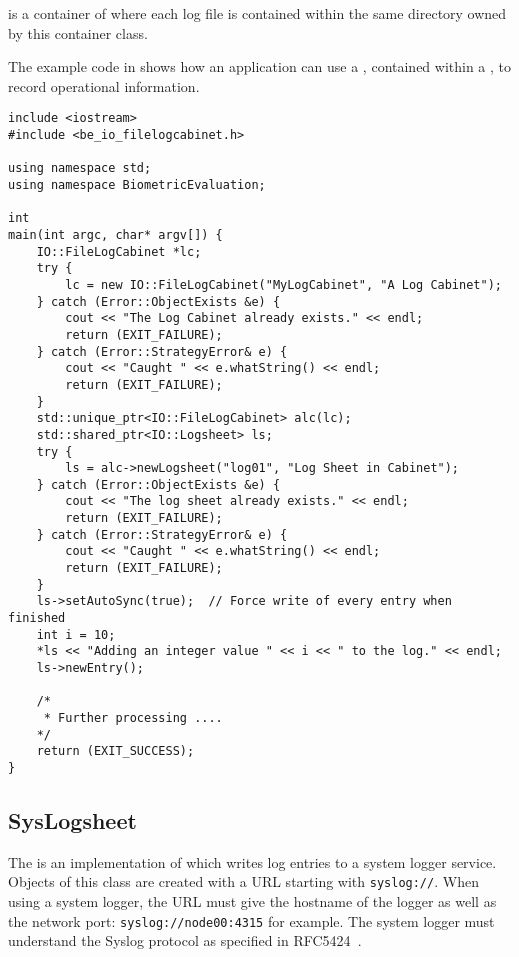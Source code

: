  is a container of  where
each log file is contained within the same directory owned by this container
class.

The example code in  shows how an application can use 
a , contained within a , to record
operational information.

\begin{lstlisting}[caption={Using a \class{FileLogsheet} within a \class{FileLogCabinet}}, label=lst:logcabinetuse]
include <iostream>
#include <be_io_filelogcabinet.h>

using namespace std;
using namespace BiometricEvaluation;

int
main(int argc, char* argv[]) {
    IO::FileLogCabinet *lc;
    try {
        lc = new IO::FileLogCabinet("MyLogCabinet", "A Log Cabinet");
    } catch (Error::ObjectExists &e) {
        cout << "The Log Cabinet already exists." << endl;
        return (EXIT_FAILURE);
    } catch (Error::StrategyError& e) {
        cout << "Caught " << e.whatString() << endl;
        return (EXIT_FAILURE);
    }
    std::unique_ptr<IO::FileLogCabinet> alc(lc);
    std::shared_ptr<IO::Logsheet> ls;
    try {
        ls = alc->newLogsheet("log01", "Log Sheet in Cabinet");
    } catch (Error::ObjectExists &e) {
        cout << "The log sheet already exists." << endl;
        return (EXIT_FAILURE);
    } catch (Error::StrategyError& e) {
        cout << "Caught " << e.whatString() << endl;
        return (EXIT_FAILURE);
    }
    ls->setAutoSync(true);  // Force write of every entry when finished
    int i = 10;
    *ls << "Adding an integer value " << i << " to the log." << endl;
    ls->newEntry();

    /*
     * Further processing ....
    */
    return (EXIT_SUCCESS);
}
\end{lstlisting}

\subsection{SysLogsheet}
\label{sec-syslogsheet}

The  is an implementation of  which writes
log entries to a system logger service. Objects of this class are created
with a URL starting with \verb=syslog://=.
When using a system logger, the URL must give the hostname of the logger as
well as the network port: \verb=syslog://node00:4315= for example. The system
logger must understand the Syslog protocol as specified in
RFC5424~\cite{rfc5425}.

